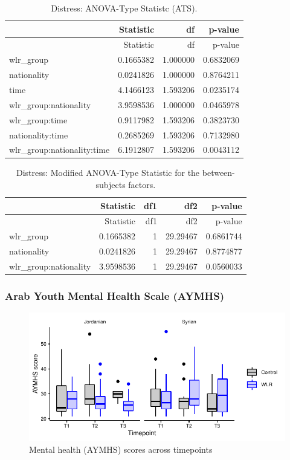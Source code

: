 \documentclass[]{article}
\begin{document}
\begin{longtable}[]{@{}lrrr@{}}
\caption{Distress: ANOVA-Type Statistc (ATS).}\tabularnewline
\toprule
& Statistic & df & p-value\tabularnewline
\midrule
\endfirsthead
\toprule
& Statistic & df & p-value\tabularnewline
\midrule
\endhead
wlr\_group & 0.1665382 & 1.000000 & 0.6832069\tabularnewline
nationality & 0.0241826 & 1.000000 & 0.8764211\tabularnewline
time & 4.1466123 & 1.593206 & 0.0235174\tabularnewline
wlr\_group:nationality & 3.9598536 & 1.000000 & 0.0465978\tabularnewline
wlr\_group:time & 0.9117982 & 1.593206 & 0.3823730\tabularnewline
nationality:time & 0.2685269 & 1.593206 & 0.7132980\tabularnewline
wlr\_group:nationality:time & 6.1912807 & 1.593206 &
0.0043112\tabularnewline
\bottomrule
\end{longtable}

\begin{longtable}[]{@{}lrrrr@{}}
\caption{Distress: Modified ANOVA-Type Statistic for the
between-subjects factors.}\tabularnewline
\toprule
& Statistic & df1 & df2 & p-value\tabularnewline
\midrule
\endfirsthead
\toprule
& Statistic & df1 & df2 & p-value\tabularnewline
\midrule
\endhead
wlr\_group & 0.1665382 & 1 & 29.29467 & 0.6861744\tabularnewline
nationality & 0.0241826 & 1 & 29.29467 & 0.8774877\tabularnewline
wlr\_group:nationality & 3.9598536 & 1 & 29.29467 &
0.0560033\tabularnewline
\bottomrule
\end{longtable}

\newpage

\hypertarget{arab-youth-mental-health-scale-aymhs}{%
\subsubsection{Arab Youth Mental Health Scale
(AYMHS)}\label{arab-youth-mental-health-scale-aymhs}}

\begin{figure}[H]

{\centering \includegraphics{WLR-analyses-report_files/figure-latex/unnamed-chunk-25-1} 

}

\caption{Mental health (AYMHS) scores across timepoints}\label{fig:unnamed-chunk-25}
\end{figure}
\end{document}
